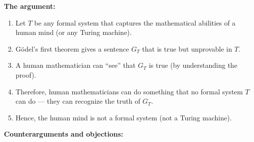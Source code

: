 \textbf{The argument:}
\begin{enumerate}
\item Let $T$ be any formal system that captures the mathematical abilities of a human mind (or any Turing machine).
\item Gödel's first theorem gives a sentence $G_T$ that is true but unprovable in $T$.
\item A human mathematician can ``see'' that $G_T$ is true (by understanding the proof).
\item Therefore, human mathematicians can do something that no formal system $T$ can do --- they can recognize the truth of $G_T$.
\item Hence, the human mind is not a formal system (not a Turing machine).
\end{enumerate}

\textbf{Counterarguments and objections:}

